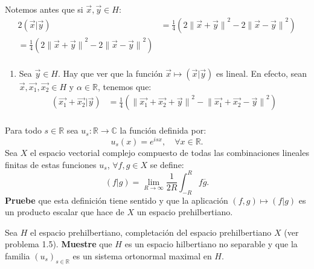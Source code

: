 \documentclass[12pt]{report}
\theoremstyle{largebreak}
\newcommand\cf[3]{\ensuremath{#1:#2\rightarrow#3}}
\newcommand\pint[2]{\ensuremath{\left(#1\big|#2\right)}}
\newcommand\conj[1]{\ensuremath{\overline{#1}}}
\newcommand\norm[1]{\ensuremath{\|#1\|}}
\begin{document}
\begin{sol}
        Notemos antes que si $\vec{x},\vec{y}\in H$:
        \begin{equation*}
            \begin{split}
                2\pint{\vec{x}}{\vec{y}}&=\frac{1}{4}\left(2\norm{\vec{x}+\vec{y}}^2-2\norm{\vec{x}-\vec{y}}^2 \right) \\
                =\frac{1}{4}\left(2\norm{\vec{x}+\vec{y}}^2-2\norm{\vec{x}-\vec{y}}^2 \right) \\
            \end{split}
        \end{equation*}
        \begin{enumerate}
            \item Sea $\vec{y}\in H$. Hay que ver que la función $\vec{x}\mapsto\pint{\vec{x}}{\vec{y}}$ es lineal. En efecto, sean $\vec{x},\vec{x_1},\vec{x_2}\in H$ y $\alpha\in\mathbb{R}$, tenemos que:
            \begin{equation*}
                \begin{split}
                    \pint{\vec{x_1}+\vec{x_2}}{\vec{y}}&=\frac{1}{4}\left(\norm{\vec{x_1}+\vec{x_2}+\vec{y}}^2-\norm{\vec{x_1}+\vec{x_2}-\vec{y}}^2 \right) \\
                \end{split}
            \end{equation*}
        \end{enumerate}
    \end{sol}

    \begin{excer}
        Para todo $s\in\mathbb{R}$ sea $\cf{u_s}{\mathbb{R}}{\mathbb{C}}$ la función definida por:
        \begin{equation*}
            u_s(x)=e^{isx},\quad\forall x\in\mathbb{R}.
        \end{equation*}
        Sea $X$ el espacio vectorial complejo compuesto de todas las combinaciones lineales finitas de estas funciones $u_s$, $\forall f,g\in X$ se define:
        \begin{equation*}
            \pint{f}{g}=\lim_{R\rightarrow\infty}\frac{1}{2R}\int_{-R}^Rf\conj{g}.
        \end{equation*}
        \textbf{Pruebe} que esta definición tiene sentido y que la aplicación $(f,g)\mapsto\pint{f}{g}$ es un producto escalar que hace de $X$ un espacio prehilbertiano.

        Sea $H$ el espacio prehilbertiano, completación del espacio prehilbertiano $X$ (ver problema 1.5). \textbf{Muestre} que $H$ es un espacio hilbertiano no separable y que la familia $\left(u_s\right)_{s\in\mathbb{R}}$ es un sistema ortonormal maximal en $H$.
    \end{excer}
\end{document}
